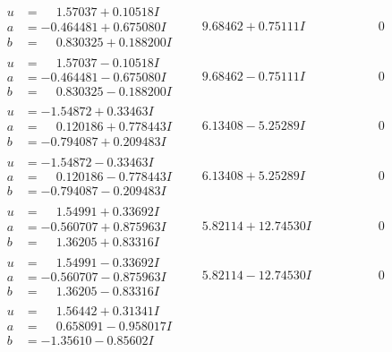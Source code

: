 \documentclass[1p]{elsarticle_modified}
\theoremstyle{definition}
\begin{document}
$$\begin{array}{c|c|c}
\begin{aligned}
u &= \phantom{-}1.57037 + 0.10518 I \\
a &= -0.464481 + 0.675080 I \\
b &= \phantom{-}0.830325 + 0.188200 I\end{aligned}
 & \phantom{-}9.68462 + 0.75111 I & \phantom{-0.000000 } 0 \\ \hline\begin{aligned}
u &= \phantom{-}1.57037 - 0.10518 I \\
a &= -0.464481 - 0.675080 I \\
b &= \phantom{-}0.830325 - 0.188200 I\end{aligned}
 & \phantom{-}9.68462 - 0.75111 I & \phantom{-0.000000 } 0 \\ \hline\begin{aligned}
u &= -1.54872 + 0.33463 I \\
a &= \phantom{-}0.120186 + 0.778443 I \\
b &= -0.794087 + 0.209483 I\end{aligned}
 & \phantom{-}6.13408 - 5.25289 I & \phantom{-0.000000 } 0 \\ \hline\begin{aligned}
u &= -1.54872 - 0.33463 I \\
a &= \phantom{-}0.120186 - 0.778443 I \\
b &= -0.794087 - 0.209483 I\end{aligned}
 & \phantom{-}6.13408 + 5.25289 I & \phantom{-0.000000 } 0 \\ \hline\begin{aligned}
u &= \phantom{-}1.54991 + 0.33692 I \\
a &= -0.560707 + 0.875963 I \\
b &= \phantom{-}1.36205 + 0.83316 I\end{aligned}
 & \phantom{-}5.82114 + 12.74530 I & \phantom{-0.000000 } 0 \\ \hline\begin{aligned}
u &= \phantom{-}1.54991 - 0.33692 I \\
a &= -0.560707 - 0.875963 I \\
b &= \phantom{-}1.36205 - 0.83316 I\end{aligned}
 & \phantom{-}5.82114 - 12.74530 I & \phantom{-0.000000 } 0 \\ \hline\begin{aligned}
u &= \phantom{-}1.56442 + 0.31341 I \\
a &= \phantom{-}0.658091 - 0.958017 I \\
b &= -1.35610 - 0.85602 I\end{aligned}

\end{array}$$
\end{document}
